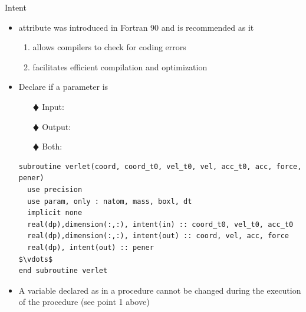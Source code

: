 \documentclass[10pt,t]{beamer}
\begin{document}
\begin{frame}[fragile]{Intent}
  \begin{itemize}
    \item {} attribute was introduced in Fortran 90 and is recommended as it
    \begin{enumerate}
      \item allows compilers to check for coding errors
      \item facilitates efficient compilation and optimization
    \end{enumerate}
    \item Declare if a parameter is
    \begin{enumerate}
      \item[$\vardiamond$]Input:  
      \item[$\vardiamond$]Output: 
      \item[$\vardiamond$]Both: 
    \end{enumerate}
    \begin{lstlisting}[language={[90]Fortran},mathescape,basicstyle=\fontsize{6}{7}\selectfont\ttfamily]
subroutine verlet(coord, coord_t0, vel_t0, vel, acc_t0, acc, force, pener)
  use precision
  use param, only : natom, mass, boxl, dt
  implicit none
  real(dp),dimension(:,:), intent(in) :: coord_t0, vel_t0, acc_t0
  real(dp),dimension(:,:), intent(out) :: coord, vel, acc, force
  real(dp), intent(out) :: pener
$\vdots$
end subroutine verlet
    \end{lstlisting}
    \item A variable declared as  in a procedure cannot be changed during the execution of the procedure (see point 1 above)
  \end{itemize}
\end{frame}
\end{document}
